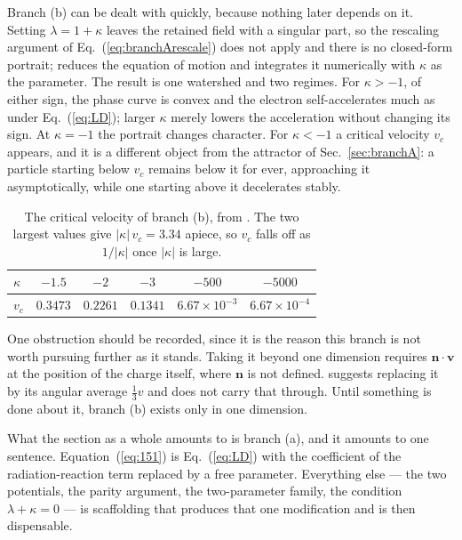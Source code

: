 \documentclass[preprint]{aastex701}
\begin{document}
Branch (b) can be dealt with quickly, because nothing later depends on it.
Setting $\lambda = 1+\kappa$ leaves the retained field with a singular part, so
the rescaling argument of Eq.~(\ref{eq:branchArescale}) does not apply and there
is no closed-form portrait; \citet{zhang2006} reduces the equation of motion and
integrates it numerically with $\kappa$ as the parameter. The result is one
watershed and two regimes. For $\kappa > -1$, of either sign, the phase curve is
convex and the electron self-accelerates much as under Eq.~(\ref{eq:LD}); larger
$\kappa$ merely lowers the acceleration without changing its sign. At
$\kappa=-1$ the portrait changes character. For $\kappa < -1$ a critical
velocity $v_c$ appears, and it is a different object from the attractor of
Sec.~\ref{sec:branchA}: a particle starting below $v_c$ remains below it for
ever, approaching it asymptotically, while one starting above it decelerates
stably.

\begin{table}[htb]
\centering
\begin{tabular}{lccccc}
\toprule
$\kappa$ & $-1.5$ & $-2$ & $-3$ & $-500$ & $-5000$ \\
\midrule
$v_c$ & $0.3473$ & $0.2261$ & $0.1341$ & $6.67\times10^{-3}$
      & $6.67\times10^{-4}$ \\
\bottomrule
\end{tabular}
\caption{The critical velocity of branch (b), from \citet{zhang2006}. The two
largest values give $|\kappa|\,v_c = 3.34$ apiece, so $v_c$ falls off as
$1/|\kappa|$ once $|\kappa|$ is large.
\label{tab:vcrit}}
\end{table}

One obstruction should be recorded, since it is the reason this branch is not
worth pursuing further as it stands. Taking it beyond one dimension requires
$\mathbf n\cdot\mathbf v$ at the position of the charge itself, where
$\mathbf n$ is not defined. \citet{zhang2006} suggests replacing it by its
angular average $\tfrac13 v$ and does not carry that through. Until something
is done about it, branch (b) exists only in one dimension.

\bigskip

What the section as a whole amounts to is branch (a), and it amounts to one
sentence. Equation~(\ref{eq:151}) is Eq.~(\ref{eq:LD}) with the coefficient of
the radiation-reaction term replaced by a free parameter. Everything else ---
the two potentials, the parity argument, the two-parameter family, the
condition $\lambda+\kappa=0$ --- is scaffolding that produces that one
modification and is then dispensable.
\end{document}
